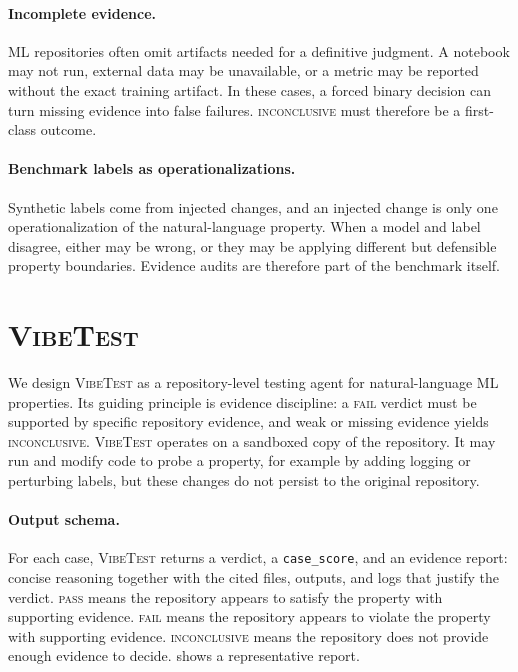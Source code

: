 \documentclass[11pt]{article}
\newcommand{\pass}{\textsc{pass}}
\newcommand{\fail}{\textsc{fail}}
\newcommand{\inconclusive}{\textsc{inconclusive}}
\newcommand{\vibetest}{\textsc{VibeTest}}
\begin{document}
\paragraph{Incomplete evidence.}
ML repositories often omit artifacts needed for a definitive judgment.
A notebook may not run, external data may be unavailable, or a metric may be
reported without the exact training artifact.
In these cases, a forced binary decision can turn missing evidence into false
failures.
\inconclusive{} must therefore be a first-class outcome.

\paragraph{Benchmark labels as operationalizations.}
Synthetic labels come from injected changes, and an injected change is only one
operationalization of the natural-language property.
When a model and label disagree, either may be wrong, or they may be applying
different but defensible property boundaries.
Evidence audits are therefore part of the benchmark itself.

\section{\vibetest}
\label{sec:method}

We design \vibetest{} as a repository-level testing agent for natural-language
ML properties.
Its guiding principle is evidence discipline: a \fail{} verdict must be supported
by specific repository evidence, and weak or missing evidence yields
\inconclusive{}.
\vibetest{} operates on a sandboxed copy of the repository.
It may run and modify code to probe a property, for example by adding logging or
perturbing labels, but these changes do not persist to the original repository.

\paragraph{Output schema.}
For each case, \vibetest{} returns a verdict, a \texttt{case\_score}, and an
evidence report: concise reasoning together with the cited files, outputs, and
logs that justify the verdict.
\pass{} means the repository appears to satisfy the property with supporting
evidence.
\fail{} means the repository appears to violate the property with supporting
evidence.
\inconclusive{} means the repository does not provide enough evidence to
decide.
 shows a representative report.
\end{document}
